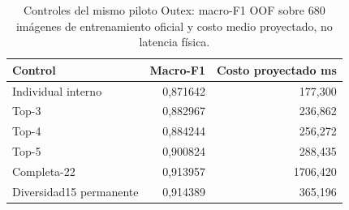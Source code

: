 \begin{table}[!htbp]
\centering\small
\caption{Controles del mismo piloto Outex: macro-F1 OOF sobre 680 imágenes de entrenamiento oficial y costo medio proyectado, no latencia física.}
\label{tab:controles-hibrido}
\begin{tabular}{@{}lrr@{}}
\toprule
Control & Macro-F1 & Costo proyectado ms\\
\midrule
Individual interno & 0,871642 & 177,300\\
Top-3 & 0,882967 & 236,862\\
Top-4 & 0,884244 & 256,272\\
Top-5 & 0,900824 & 288,435\\
Completa-22 & 0,913957 & 1706,420\\
Diversidad15 permanente & 0,914389 & 365,196\\
\bottomrule
\end{tabular}
\end{table}
